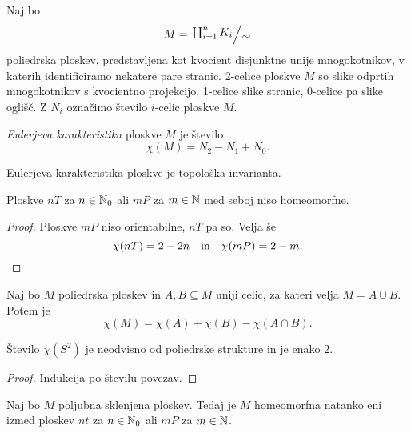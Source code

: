 \begin{definicija}
Naj bo
\[
M = \kvoc{\coprod_{i=1}^n K_i}{\sim}
\]
poliedrska ploskev, predstavljena kot kvocient disjunktne unije
mnogokotnikov, v katerih identificiramo nekatere pare stranic.
2-celice ploskve $M$ so slike odprtih mnogokotnikov s kvocientno
projekcijo, 1-celice slike stranic, 0-celice pa slike oglišč. Z
$N_i$ označimo število $i$-celic ploskve $M$.

\emph{Eulerjeva karakteristika}
ploskve $M$ je število
\[
\chi(M) = N_2 - N_1 + N_0.
\]
\end{definicija}

\begin{trditev}
Eulerjeva karakteristika ploskve je topološka invarianta.
\end{trditev}

\begin{trditev}
Ploskve $nT$ za $n \in \mathbb{N}_0$ ali $mP$ za $m \in \mathbb{N}$ med seboj niso
homeomorfne.
\end{trditev}

\begin{proof}
Ploskve $mP$ niso orientabilne, $nT$ pa so. Velja še
\[
\chi(nT) = 2 - 2n
\quad \text{in} \quad
\chi(mP) = 2 - m. \qedhere
\]
\end{proof}


\begin{trditev}
Naj bo $M$ poliedrska ploskev in $A, B \subseteq M$ uniji celic, za
kateri velja $M = A \cup B$. Potem je
\[
\chi(M) = \chi(A) + \chi(B) - \chi(A \cap B).
\]
\end{trditev}

\begin{trditev}
Število $\chi(S^2)$ je neodvisno od poliedrske strukture in je
enako $2$.
\end{trditev}

\begin{proof}
Indukcija po številu povezav.
\end{proof}

\begin{izrek}
Naj bo $M$ poljubna sklenjena ploskev. Tedaj je $M$ homeomorfna
natanko eni izmed ploskev $nt$ za $n \in \mathbb{N}_0$ ali $mP$ za
$m \in \mathbb{N}$.
\end{izrek}

